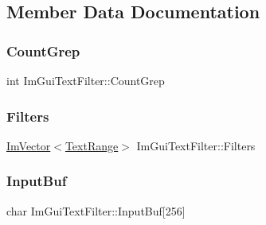 \subsection{Member Data Documentation}
\hypertarget{struct_im_gui_text_filter_ac31839c319fe4211c21fc143b7249f86}{}\label{struct_im_gui_text_filter_ac31839c319fe4211c21fc143b7249f86} 
\subsubsection{\texorpdfstring{Count\+Grep}{CountGrep}}
{\footnotesize\ttfamily int Im\+Gui\+Text\+Filter\+::\+Count\+Grep}

\hypertarget{struct_im_gui_text_filter_a5a930a339a9384e6bfadfa56a7c111fd}{}\label{struct_im_gui_text_filter_a5a930a339a9384e6bfadfa56a7c111fd} 
\subsubsection{\texorpdfstring{Filters}{Filters}}
{\footnotesize\ttfamily \hyperlink{class_im_vector}{Im\+Vector}$<$\hyperlink{struct_im_gui_text_filter_1_1_text_range}{Text\+Range}$>$ Im\+Gui\+Text\+Filter\+::\+Filters}

\hypertarget{struct_im_gui_text_filter_ad070acb1038199dd4e8f5d010c5cb5ba}{}\label{struct_im_gui_text_filter_ad070acb1038199dd4e8f5d010c5cb5ba} 
\subsubsection{\texorpdfstring{Input\+Buf}{InputBuf}}
{\footnotesize\ttfamily char Im\+Gui\+Text\+Filter\+::\+Input\+Buf\mbox{[}256\mbox{]}}

